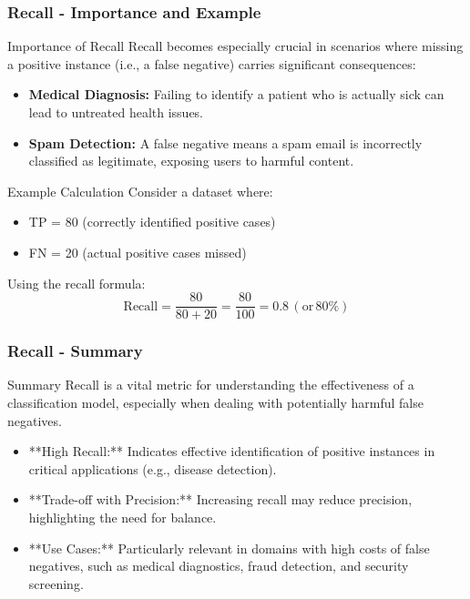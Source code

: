 \documentclass{beamer}
\begin{document}
\begin{frame}[fragile]
    \frametitle{Recall - Importance and Example}
    \begin{block}{Importance of Recall}
        Recall becomes especially crucial in scenarios where missing a positive instance (i.e., a false negative) carries significant consequences:
        \begin{itemize}
            \item \textbf{Medical Diagnosis:} Failing to identify a patient who is actually sick can lead to untreated health issues.
            \item \textbf{Spam Detection:} A false negative means a spam email is incorrectly classified as legitimate, exposing users to harmful content.
        \end{itemize}
    \end{block}
    
    \begin{block}{Example Calculation}
        Consider a dataset where:
        \begin{itemize}
            \item TP = 80 (correctly identified positive cases)
            \item FN = 20 (actual positive cases missed)
        \end{itemize}
        Using the recall formula:
        \begin{equation}
            \text{Recall} = \frac{80}{80 + 20} = \frac{80}{100} = 0.8 \, (\text{or} \, 80\%)
        \end{equation}
    \end{block}
\end{frame}

\begin{frame}[fragile]
    \frametitle{Recall - Summary}
    \begin{block}{Summary}
        Recall is a vital metric for understanding the effectiveness of a classification model, especially when dealing with potentially harmful false negatives. 
        \begin{itemize}
            \item **High Recall:** Indicates effective identification of positive instances in critical applications (e.g., disease detection).
            \item **Trade-off with Precision:** Increasing recall may reduce precision, highlighting the need for balance.
            \item **Use Cases:** Particularly relevant in domains with high costs of false negatives, such as medical diagnostics, fraud detection, and security screening.
        \end{itemize}
    \end{block}
\end{frame}
\end{document}
